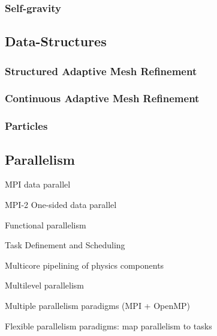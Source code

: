 \documentclass{article}
\begin{document}
\subsubsection{Self-gravity}

\subsection{Data-Structures}

\subsubsection{Structured Adaptive Mesh Refinement}

\subsubsection{Continuous Adaptive Mesh Refinement}

\subsubsection{Particles}



\subsection{Parallelism}

MPI data parallel

MPI-2 One-sided data parallel

Functional parallelism

Task Definement and Scheduling

Multicore pipelining of physics components


Multilevel parallelism

Multiple parallelism paradigms (MPI + OpenMP)

Flexible parallelism paradigms: map parallelism to tasks
\end{document}
